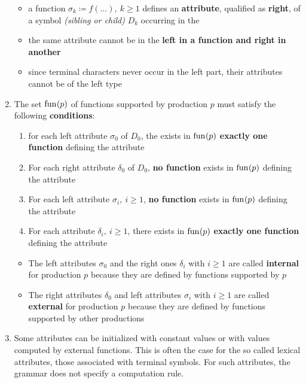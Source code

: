 \documentclass[english]{article}
\begin{document}
\begin{definition}
\begin{enumerate}
\begin{itemize}
            \item a function \(\sigma_k \coloneqq f(\ldots), \ k \geq 1\) defines an \textbf{attribute}, qualified as \textbf{right}, of a symbol \textit{(sibling or child)} \(D_k\) occurring in the \RP
            \item the same attribute cannot be in the \textbf{left in a function and right in another}
            \item since terminal characters never occur in the left part, their attributes cannot be of the left type
          \end{itemize}
    \item The set \(\text{fun}\hspace{0.1ex}(p)\) of functions supported by production \(p\) must satisfy the following \textbf{conditions}:
          \begin{enumerate}[label=\Alph*.]
            \item for each left attribute \(\sigma_0\) of \(D_0\), the exists in \(\text{fun}\hspace{0.1ex}(p)\) \textbf{exactly one function} defining the attribute
            \item For each right attribute \(\delta_0\) of \(D_0\), \textbf{no function} exists in \(\text{fun}\hspace{0.1ex}(p)\) defining the attribute
            \item For each left attribute \(\sigma_i, \ i \geq 1\), \textbf{no function }exists in \(\text{fun}\hspace{0.1ex}(p)\) defining the attribute
            \item For each attribute \(\delta_i, \ i \geq 1\), there exists in \(\text{fun}\hspace{0.1ex}(p)\) \textbf{exactly one function} defining the attribute
          \end{enumerate}
          \smallskip
          \begin{itemize}
            \item The left attributes \(\sigma_0\) and the right ones \(\delta_i\) with \(i \geq 1\) are called \textbf{internal} for production \(p\) because they are  defined by functions supported by \(p\)
            \item The right attributes \(\delta_0\) and left attributes \(\sigma_i\) with \(i \geq 1\) are called \textbf{external} for production \(p\) because they are defined by functions supported by other productions
          \end{itemize}
    \item Some attributes can be initialized with constant values or with values computed by external functions.
          This is often the case for the so called lexical attributes, those associated with terminal symbols.
          For such attributes, the grammar does not specify a computation rule.
  \end{enumerate}
\end{definition}
\end{document}
